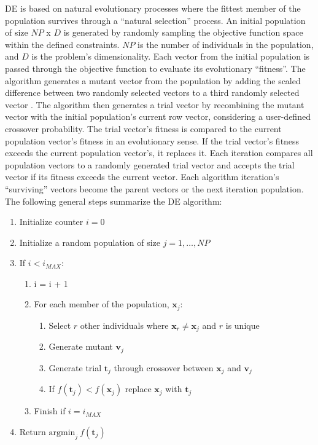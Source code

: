 \Gls{DE} is based on natural evolutionary processes where the fittest member of the population survives through a ``natural selection'' process. An initial population of size $NP$ x $D$ is generated by randomly sampling the objective function space within the defined constraints. $NP$ is the number of individuals in the population, and $D$ is the problem's dimensionality. Each vector from the initial population is passed through the objective function to evaluate its evolutionary ``fitness''. The algorithm generates a mutant vector from the population by adding the scaled difference between two randomly selected vectors to a third randomly selected vector \citep{price2013differential}. The algorithm then generates a trial vector by recombining the mutant vector with the initial population's current row vector, considering a user-defined crossover probability. The trial vector's fitness is compared to the current population vector's fitness in an evolutionary sense. If the trial vector's fitness exceeds the current population vector's, it replaces it. Each iteration compares all population vectors to a randomly generated trial vector and accepts the trial vector if its fitness exceeds the current vector. Each algorithm iteration's ``surviving'' vectors become the parent vectors or the next iteration population. The following general steps summarize the \gls{DE} algorithm:
\begin{enumerate}[noitemsep]
    \item Initialize counter $i=0$
    \item Initialize a random population of size $j = 1, \dots, NP$
    \item If $i < i_{MAX}$:
          \begin{enumerate}
              \item i = i + 1
              \item For each member of the population, $\mathbf{x}_{j}$:
                    \begin{enumerate}[noitemsep]
                        \item Select $r$ other individuals where $\mathbf{x}_{r} \neq \mathbf{x}_{j}$ and $r$ is unique
                        \item Generate mutant $\mathbf{v}_{j}$
                        \item Generate trial $\mathbf{t}_{j}$ through crossover between $\mathbf{x}_{j}$ and $\mathbf{v}_{j}$
                        \item If $f(\mathbf{t}_{j}) < f(\mathbf{x}_{j})$ replace $\mathbf{x}_{j}$ with $\mathbf{t}_{j}$
                    \end{enumerate}
              \item Finish if $i = i_{MAX}$
          \end{enumerate}
    \item Return $\text{argmin}_{j} \ f(\mathbf{t}_{j})$
\end{enumerate}

